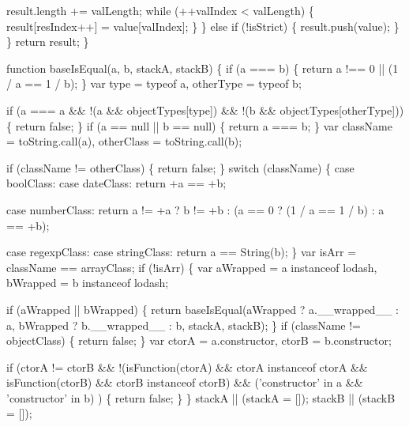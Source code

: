 \begin{DoxyCodeInclude}
{{        result.length += valLength;
        \textcolor{keywordflow}{while} (++valIndex < valLength) \{
          result[resIndex++] = value[valIndex];
        \}
      \} \textcolor{keywordflow}{else} \textcolor{keywordflow}{if} (!isStrict) \{
        result.push(value);
      \}
    \}
    \textcolor{keywordflow}{return} result;
  \}

  \textcolor{keyword}{function} baseIsEqual(a, b, stackA, stackB) \{
    \textcolor{keywordflow}{if} (a === b) \{
      \textcolor{keywordflow}{return} a !== 0 || (1 / a == 1 / b);
    \}
    var type = typeof a,
        otherType = typeof b;

    \textcolor{keywordflow}{if} (a === a &&
        !(a && objectTypes[type]) &&
        !(b && objectTypes[otherType])) \{
      \textcolor{keywordflow}{return} \textcolor{keyword}{false};
    \}
    \textcolor{keywordflow}{if} (a == null || b == null) \{
      \textcolor{keywordflow}{return} a === b;
    \}
    var className = toString.call(a),
        otherClass = toString.call(b);

    \textcolor{keywordflow}{if} (className != otherClass) \{
      \textcolor{keywordflow}{return} \textcolor{keyword}{false};
    \}
    \textcolor{keywordflow}{switch} (className) \{
      \textcolor{keywordflow}{case} boolClass:
      \textcolor{keywordflow}{case} dateClass:
        \textcolor{keywordflow}{return} +a == +b;

      \textcolor{keywordflow}{case} numberClass:
        \textcolor{keywordflow}{return} a != +a
          ? b != +b
          : (a == 0 ? (1 / a == 1 / b) : a == +b);

      \textcolor{keywordflow}{case} regexpClass:
      \textcolor{keywordflow}{case} stringClass:
        \textcolor{keywordflow}{return} a == String(b);
    \}
    var isArr = className == arrayClass;
    \textcolor{keywordflow}{if} (!isArr) \{
      var aWrapped = a instanceof lodash,
          bWrapped = b instanceof lodash;

      \textcolor{keywordflow}{if} (aWrapped || bWrapped) \{
        \textcolor{keywordflow}{return} baseIsEqual(aWrapped ? a.\_\_wrapped\_\_ : a, bWrapped ? b.\_\_wrapped\_\_ : b, stackA, stackB);
      \}
      \textcolor{keywordflow}{if} (className != objectClass) \{
        \textcolor{keywordflow}{return} \textcolor{keyword}{false};
      \}
      var ctorA = a.constructor,
          ctorB = b.constructor;

      \textcolor{keywordflow}{if} (ctorA != ctorB &&
            !(isFunction(ctorA) && ctorA instanceof ctorA && isFunction(ctorB) && ctorB instanceof ctorB) 
      &&
            (\textcolor{stringliteral}{'constructor'} in a && \textcolor{stringliteral}{'constructor'} in b)
          ) \{
        \textcolor{keywordflow}{return} \textcolor{keyword}{false};
      \}
    \}
    stackA || (stackA = []);
    stackB || (stackB = []);

}}
\end{DoxyCodeInclude}
